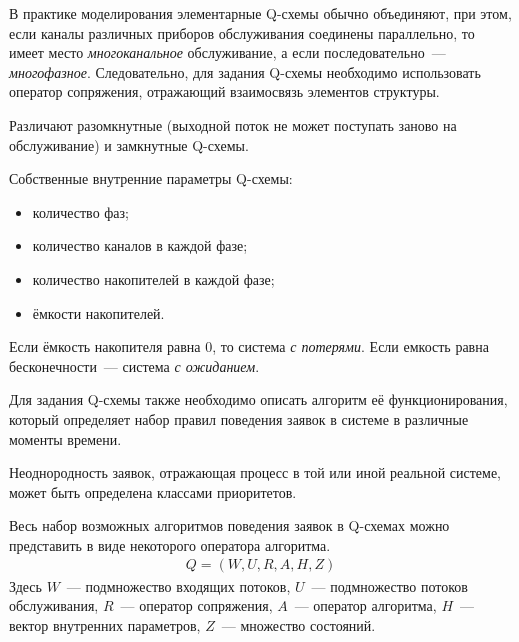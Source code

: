 В практике моделирования элементарные Q-схемы обычно объединяют, при этом, если каналы различных приборов обслуживания соединены параллельно, то имеет место \textit{многоканальное} обслуживание, а если последовательно~--- \textit{многофазное}. Следовательно, для задания Q-схемы необходимо использовать оператор сопряжения, отражающий взаимосвязь элементов структуры.

Различают разомкнутные (выходной поток не может поступать заново на обслуживание) и замкнутные Q-схемы.

Собственные внутренние параметры Q-схемы:

\begin{itemize}
    \item количество фаз;
    \item количество каналов в каждой фазе;
    \item количество накопителей в каждой фазе;
    \item ёмкости накопителей.
\end{itemize}

Если ёмкость накопителя равна 0, то система \textit{с потерями}. Если емкость равна бесконечности~--- система \textit{с ожиданием}.

Для задания Q-схемы также необходимо описать алгоритм её функционирования, который определяет набор правил поведения заявок в системе в различные моменты времени.

Неоднородность заявок, отражающая процесс в той или иной реальной системе, может быть определена классами приоритетов.

Весь набор возможных алгоритмов поведения заявок в Q-схемах можно представить в виде некоторого оператора алгоритма.
%
\begin{gather*}
    Q = (W, U, R, A, H, Z)
\end{gather*}
%
Здесь $W$~--- подмножество входящих потоков, $U$~--- подмножество потоков обслуживания, $R$~--- оператор сопряжения, $A$~--- оператор алгоритма, $H$~--- вектор внутренних параметров, $Z$~--- множество состояний.